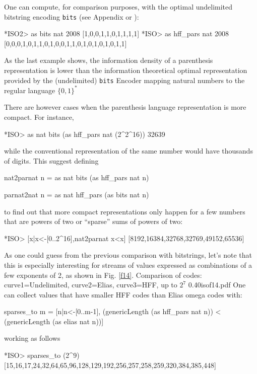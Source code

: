 \documentclass[]{INCLUDES/llncs}
\begin{document}
One can compute, for comparison purposes, with the optimal undelimited
bitstring encoding {\tt bits} (see Appendix or \cite{arxiv:fISO}):
\begin{codex}
*ISO2> as bits nat 2008
[1,0,0,1,1,0,1,1,1,1]
*ISO> as hff_pars nat 2008
[0,0,0,1,0,1,1,0,1,0,0,1,1,0,1,0,1,0,1,0,1,1]
\end{codex}
As the last example shows, the information density of
a parenthesis representation is lower than the information theoretical optimal
representation provided by the (undelimited) {\tt bits} Encoder mapping
natural numbers to the regular language $\{0,1\}^*$

There are however cases when the parenthesis language representation is more
compact. For instance,
\begin{codex}
*ISO> as nat bits (as hff_pars nat (2^2^16))
32639
\end{codex}
while the conventional representation of the same number would
have thousands of digits. This suggest defining
\begin{code}
nat2parnat n = as nat bits (as hff_pars nat n)

parnat2nat n = as nat hff_pars (as bits nat n)
\end{code}
to find out that more compact representations only happen
for a few numbers that are powers of two or ``sparse'' sums of
powers of two:
\begin{codex}
*ISO> [x|x<-[0..2^16],nat2parnat x<x]
[8192,16384,32768,32769,49152,65536]
\end{codex}

As one could guess from the previous comparison with bitstrings, let's
note that this is especially interesting for streams of values 
expressed as combinations of a few exponents of 2, as shown in Fig.
\ref{f14}.
{Comparison of codes: curve1=Undelimited, curve2=Elias, curve3=HFF, up to
$2^{7}$} {0.40}{isof14.pdf}
One can collect values that have smaller HFF codes than Elias omega codes
with:
\begin{code}
sparses_to m = [n|n<-[0..m-1],
  (genericLength (as hff_pars nat n)) 
  <
  (genericLength (as elias nat n))]
\end{code}
working as follows
\begin{codex}
*ISO> sparses_to (2^9)
[15,16,17,24,32,64,65,96,128,129,192,256,257,258,259,320,384,385,448]
\end{codex}
\end{document}

